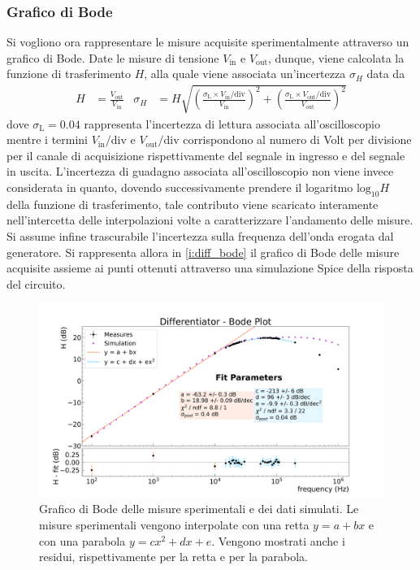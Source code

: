 \documentclass[a4paper,11pt]{article} %
\begin{document}
\subsubsection{Grafico di Bode}
Si vogliono ora rappresentare le misure acquisite sperimentalmente attraverso un grafico di Bode. Date le misure di
tensione $V_{\text{in}}$ e $V_{\text{out}}$, dunque, viene calcolata la funzione di trasferimento $H$, alla quale viene
associata un'incertezza $\sigma_{H}$ data da
\begin{align}\label{e:diff_err}
	H&=\frac{V_{\text{out}}}{V_{\text{in}}} & 
	\sigma_{H}&= H \sqrt{	
						\left(	\frac{	\sigma_{\text{L}}\times V_{\text{in}}/\text{div}	}{	V_{\text{in}}	}	\right)^2	 + 
						\left(	\frac{	\sigma_{\text{L}}\times V_{\text{out}}/\text{div}	}{	V_{\text{out}}	}	\right)^2 }
\end{align}
\noindent dove $\sigma_{\text{L}}=0.04$ rappresenta l'incertezza di lettura associata all'oscilloscopio mentre i termini
$V_{\text{in}}/\text{div}$ e $V_{\text{out}}/\text{div}$ corrispondono al numero di Volt per divisione per il canale di
acquisizione rispettivamente del segnale in ingresso e del segnale in uscita. L'incertezza di guadagno associata
all'oscilloscopio non viene invece considerata in quanto, dovendo successivamente prendere il logaritmo
$\text{log}_{10}H$ della funzione di trasferimento, tale contributo viene scaricato interamente nell'intercetta delle
interpolazioni volte a caratterizzare l'andamento delle misure. Si assume infine trascurabile l'incertezza sulla
frequenza dell'onda erogata dal generatore. Si rappresenta allora in \autoref{i:diff_bode} il grafico di Bode delle
misure acquisite assieme ai punti ottenuti attraverso una simulazione Spice della risposta del circuito. \newpage
\begin{figure}[H]
	\centering
	\includegraphics[width=16cm]{../Plots/Report_Plots/diff_bode_plot.png}
	\caption{\small Grafico di Bode delle misure sperimentali e dei dati simulati. Le misure sperimentali vengono
	interpolate con una retta $y = a + bx$ e con una parabola $y = cx^2+dx+e$. Vengono mostrati anche i residui, 
	rispettivamente per la retta e per la parabola.}
	\label{i:diff_bode}
\end{figure}
\end{document}

